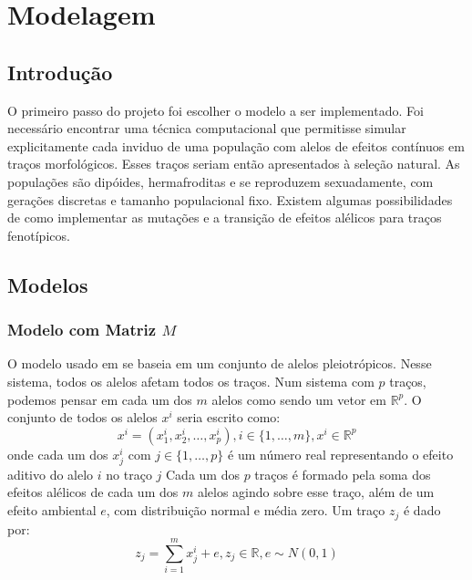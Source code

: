 \pagestyle{empty}
\cleardoublepage
\pagestyle{fancy}
\chapter{Modelagem}\label{cap2}

\section{Introdução}\label{cap2:intro}

O primeiro passo do projeto foi escolher o modelo a ser implementado.
Foi necessário encontrar uma técnica computacional que permitisse
simular explicitamente cada inviduo de uma população com alelos de efeitos
contínuos em traços morfológicos. 
Esses traços seriam então apresentados à seleção natural.
As populações são dipóides, hermafroditas e se reproduzem sexuadamente,
com gerações discretas e tamanho populacional fixo.
Existem algumas possibilidades de como implementar as mutações e
a transição de efeitos alélicos para traços fenotípicos.

\section{Modelos}\label{cap2:mem}

\subsection{Modelo com Matriz $M$}\label{cap2:mem:ModelM}

O modelo usado em \cite{Jones2003, Jones2004, Jones2007} se baseia em um
conjunto de alelos pleiotrópicos.
Nesse sistema, todos os alelos afetam todos os traços.
Num sistema com $p$ traços, podemos pensar em cada um
dos $m$ alelos como sendo um vetor em $\mathbb{R}^p$.
O conjunto de todos os alelos $x^i$ seria escrito como:
\begin{equation}
x^i = ( x^i_1, x^i_2,\ldots, x^i_p), i \in \{1,\ldots, m\}, x^i \in \mathbb{R}^p
\end{equation}
onde cada um dos $x^i_j$ com $j \in \{1,\ldots, p\}$ é um número real
representando o efeito aditivo do alelo $i$ no traço $j$
Cada um dos
$p$ traços é formado pela soma dos efeitos alélicos de cada um dos
$m$ alelos agindo sobre esse traço, além de um efeito ambiental $e$, com
distribuição normal e média zero.
Um traço $z_j$ é dado
por:
\begin{equation}
z_j = \sum_{i=1}^m x^i_j + e, z_j \in \mathbb{R}, e \sim N(0, 1)
\end{equation}

